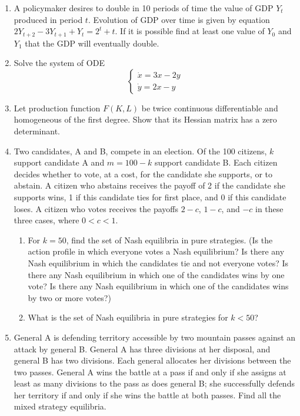 \documentclass[a4paper]{article}
\begin{document}
\begin{enumerate}

\item A policymaker desires to double in 10 periods of time the value of GDP $Y_t$ produced in period $t$. Evolution of GDP over time is given by equation $2Y_{t+2}-3Y_{t+1}+Y_t=2^t+t$. If it is possible find at least one value of  $Y_0$ and $Y_1$ that the GDP will eventually double.


\item  Solve the system of ODE
\[
\begin{cases}
\dot{x}=3x-2y \\
\dot{y}=2x-y
\end{cases}
\]




\item  Let production function $F(K, L)$ be twice continuous differentiable and homogeneous of the first degree. Show that its Hessian matrix has a zero determinant.

\item  Two candidates, A and B, compete in an election. Of the 100 citizens, $k$ support candidate A and $m= 100 - k$ support candidate B. Each citizen decides whether to vote, at a cost, for the candidate she supports, or to abstain. A citizen who abstains receives the payoff of 2 if the candidate she supports wins, 1 if this candidate ties for first place, and 0 if this candidate loses. A citizen who votes receives the payoffs $2 - c$, $1 - c$, and $-c$ in these three cases, where $0 < c < 1$.
\begin{enumerate}
\item  For $k = 50$, find the set of Nash equilibria in pure strategies. (Is the action profile in which everyone votes a Nash equilibrium? Is there any Nash equilibrium in which the candidates tie and not everyone votes? Is there any Nash equilibrium in which one of the candidates wins by one vote? Is there any Nash equilibrium in which one of the candidates wins by two or more votes?)
\item  What is the set of Nash equilibria in pure strategies for $k < 50$?
\end{enumerate}

\item General A is defending territory accessible by two mountain passes against an attack by general B. General A has three divisions at her disposal, and general B has two divisions. Each general allocates her divisions between the two passes. General A wins the battle at a pass if and only if she assigns at least as many divisions to the pass as does general B; she successfully defends her territory if and only if she wins the battle at both passes. Find all the mixed strategy equilibria.


\end{enumerate}
\end{document}

